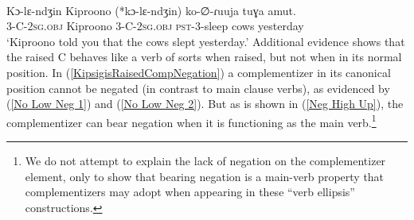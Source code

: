 \documentclass[output=paper
,modfonts
,nonflat
]{langsci/langscibook}
\begin{document}
\ea \label{KipsigisRaisedComp}
\\
\gll Kɔ-lɛ-ndʒin Kiproono (*kɔ-lɛ-ndʒin) ko-∅-ɾuuja tuɣa amut. \\
3-C-2\textsc{sg}.\textsc{obj} Kiproono 3-C-2\textsc{sg}.\textsc{obj} \textsc{pst}-3-sleep cows yesterday \\
\glt `Kiproono told you that the cows slept yesterday.'
\z
\noindent Additional evidence shows that the raised C behaves like a verb of sorts when raised, but not when in its normal position. In (\ref{KipsigisRaisedCompNegation}) a complementizer in its canonical position cannot be negated (in contrast to main clause verbs), as evidenced by (\ref{No Low Neg 1}) and (\ref{No Low Neg 2}). But as is shown in (\ref{Neg High Up}), the complementizer can bear negation when it is functioning as the main verb.\footnote{We do not attempt to explain the lack of negation on the complementizer element, only to show that bearing negation is a main-verb property that complementizers may adopt when appearing in these ``verb ellipsis'' constructions.} 
\end{document}
